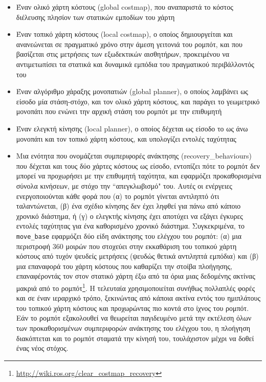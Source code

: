 \begin{itemize}
  \item Έναν ολικό χάρτη κόστους (global costmap), που αναπαριστά το κόστος
        διέλευσης πλησίον των στατικών εμποδίων του χάρτη
  \item Έναν τοπικό χάρτη κόστους (local costmap), ο οποίος δημιουργείται και
        ανανεώνεται σε πραγματικό χρόνο στην άμεση γειτονιά του ρομπότ, και που
        βασίζεται στις μετρήσεις των εξωδεκτικών αισθητήρων, προκειμένου να
        αντιμετωπίσει τα στατικά και δυναμικά εμπόδια του πραγματικού
        περιβάλλοντός του
  \item Έναν αλγόριθμο χάραξης μονοπατιών (global planner), ο οποίος λαμβάνει
        ως είσοδο μία στάση-στόχο, και τον ολικό χάρτη κόστους, και παράγει το
        γεωμετρικό μονοπάτι που ενώνει την αρχική στάση του ρομπότ με την
        επιθυμητή
  \item Έναν ελεγκτή κίνησης (local planner), ο οποίος δέχεται ως είσοδο το ως
        άνω μονοπάτι και τον τοπικό χάρτη κόστους, και υπολογίζει εντολές
        ταχύτητας
  \item Μια ενότητα που ονομάζεται συμπεριφορές ανάκτησης (recovery\_behaviours)
        που δέχεται και τους δύο χάρτες κόστους ως είσοδο, εντοπίζει πότε το
        ρομπότ δεν μπορεί να προχωρήσει με την επιθυμητή ταχύτητα, και
        εφαρμόζει προκαθορισμένα σύνολα κινήσεων, με στόχο την ``απεγκλωβισμό"
        του. Αυτές οι ενέργειες ενεργοποιούνται κάθε φορά που (α) το ρομπότ
        γίνεται αντιληπτό ότι ταλαντώνεται, (β) ένα σχέδιο κίνησης δεν έχει
        ληφθεί για πάνω από κάποιο χρονικό διάστημα, ή (γ) ο ελεγκτής κίνησης
        έχει αποτύχει να εξάγει έγκυρες εντολές ταχύτητας για ένα καθορισμένο
        χρονικό διάστημα. Συγκεκριμένα, το \texttt{move\_base} εφαρμόζει δύο
        είδη ανάκτησης του ελέγχου του ρομπότ: (α) μια περιστροφή $360$ μοιρών
        που στοχεύει στην εκκαθάριση του τοπικού χάρτη κόστους από τυχόν
        ψευδείς μετρήσεις (ψευδώς θετικά αντιληπτά εμπόδια) και (β) μια
        επαναφορά του χάρτη κόστους που καθαρίζει την στοίβα πλοήγησης,
        επαναφέροντάς τον στον στατικό χάρτη έξω από τα όρια μιας δεδομένης
        ακτίνας μακριά από το
        ρομπότ\footnote{\url{http://wiki.ros.org/clear\_costmap\_recovery}}. Η
        τελευταία χρησιμοποιείται συνήθως πολλαπλές φορές και σε έναν ιεραρχικό
        τρόπο, ξεκινώντας από κάποια ακτίνα εντός του ημιπλάτους του τοπικού
        χάρτη κόστους και προχωρώντας πιο κοντά στο ίχνος του ρομπότ. Εάν το
        ρομπότ εξακολουθεί να θεωρείται παγιδευμένο μετά την εκτέλεση όλων των
        προκαθορισμένων συμπεριφορών ανάκτησης του ελέγχου του, η πλοήγηση
        διακόπτεται και το ρομπότ σταματά την κίνησή του, τουλάχιστον μέχρι να
        δοθεί ένας νέος στόχος.
\end{itemize}


